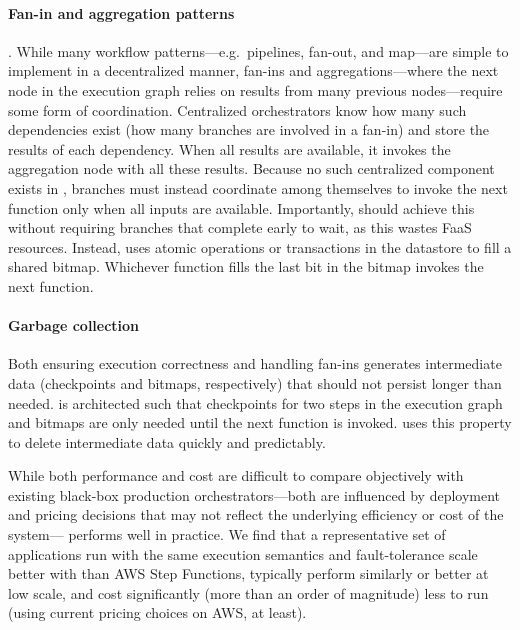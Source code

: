 
\paragraph{Fan-in and aggregation patterns}. While many workflow
patterns---e.g.\ pipelines, fan-out, and map---are simple to implement in a
decentralized manner, fan-ins and aggregations---where the next node in the
execution graph relies on results from many previous nodes---require some form
of coordination. Centralized orchestrators know how many such dependencies exist
(how many branches are involved in a fan-in) and store the results of each
dependency. When all results are available, it invokes the aggregation node with
all these results. Because no such centralized component exists in \name{},
branches must instead coordinate among themselves to invoke the next function
only when all inputs are available. Importantly, \name{} should achieve this
without requiring branches that complete early to wait, as this wastes FaaS
resources. Instead, \name{} uses atomic operations or transactions in the
datastore to fill a shared bitmap. Whichever function fills the last bit in the
bitmap invokes the next function.

\paragraph{Garbage collection} Both ensuring execution correctness and handling
fan-ins generates intermediate data (checkpoints and bitmaps, respectively) that
should not persist longer than needed. \name{} is architected such that
checkpoints for two steps in the execution graph and bitmaps are only needed
until the next function is invoked. \name{} uses this property to delete
intermediate data quickly and predictably.

While both performance and cost are difficult to compare objectively with
existing black-box production orchestrators---both are influenced by deployment
and pricing decisions that may not reflect the underlying efficiency or cost of
the system---\name{} performs well in practice. We find that a representative
set of applications run with the same execution semantics and fault-tolerance
scale better with \name{} than AWS Step Functions, typically perform similarly
or better at low scale, and cost significantly (more than an order of magnitude)
less to run (using current pricing choices on AWS, at least).


